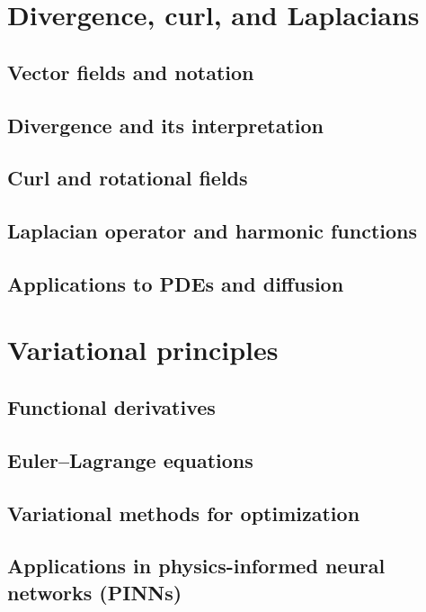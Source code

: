 \section{Divergence, curl, and Laplacians}
\subsection{Vector fields and notation}
\subsection{Divergence and its interpretation}
\subsection{Curl and rotational fields}
\subsection{Laplacian operator and harmonic functions}
\subsection{Applications to PDEs and diffusion}

\section{Variational principles}
\subsection{Functional derivatives}
\subsection{Euler–Lagrange equations}
\subsection{Variational methods for optimization}
\subsection{Applications in physics-informed neural networks (PINNs)}


